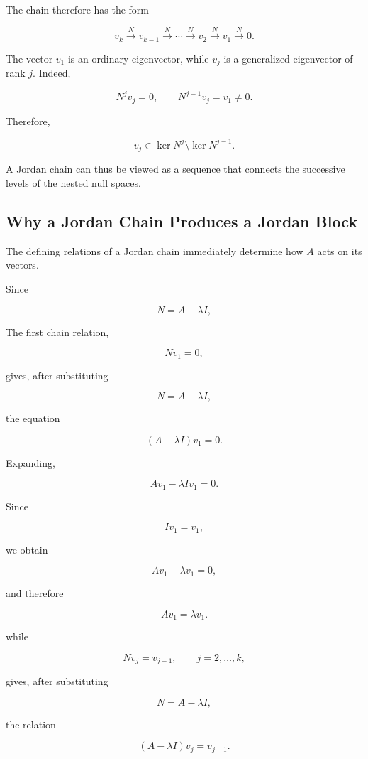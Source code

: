 \documentclass[11pt]{article}
\begin{document}
The chain therefore has the form

\[
\boxed{
v_k
\xrightarrow{\,N\,}
v_{k-1}
\xrightarrow{\,N\,}
\cdots
\xrightarrow{\,N\,}
v_2
\xrightarrow{\,N\,}
v_1
\xrightarrow{\,N\,}
0.
}
\]

The vector \(v_1\) is an ordinary eigenvector, while \(v_j\) is a
generalized eigenvector of rank \(j\).  Indeed,

\[
N^jv_j=0,
\qquad
N^{j-1}v_j=v_1\neq0.
\]

Therefore,

\[
\boxed{
v_j\in\ker N^j\setminus\ker N^{j-1}.
}
\]

A Jordan chain can thus be viewed as a sequence that connects the
successive levels of the nested null spaces.


\subsection{Why a Jordan Chain Produces a Jordan Block}

The defining relations of a Jordan chain immediately determine how
\(A\) acts on its vectors.

Since

\[
N=A-\lambda I,
\]

The first chain relation,

\[
Nv_1=0,
\]

gives, after substituting

\[
N=A-\lambda I,
\]

the equation

\[
(A-\lambda I)v_1=0.
\]

Expanding,

\[
Av_1-\lambda Iv_1=0.
\]

Since

\[
Iv_1=v_1,
\]

we obtain

\[
Av_1-\lambda v_1=0,
\]

and therefore

\[
\boxed{
Av_1=\lambda v_1.
}
\]

while

\[
Nv_j=v_{j-1},
\qquad j=2,\ldots,k,
\]

gives, after substituting

\[
N=A-\lambda I,
\]

the relation

\[
(A-\lambda I)v_j=v_{j-1}.
\]
\end{document}
